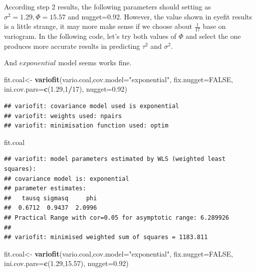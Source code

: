\documentclass[]{article}
\newenvironment{Shaded}{\begin{snugshade}}{\end{snugshade}}
\newcommand{\KeywordTok}[1]{\textcolor[rgb]{0.13,0.29,0.53}{\textbf{#1}}}
\newcommand{\DataTypeTok}[1]{\textcolor[rgb]{0.13,0.29,0.53}{#1}}
\newcommand{\DecValTok}[1]{\textcolor[rgb]{0.00,0.00,0.81}{#1}}
\newcommand{\FloatTok}[1]{\textcolor[rgb]{0.00,0.00,0.81}{#1}}
\newcommand{\StringTok}[1]{\textcolor[rgb]{0.31,0.60,0.02}{#1}}
\newcommand{\OtherTok}[1]{\textcolor[rgb]{0.56,0.35,0.01}{#1}}
\newcommand{\OperatorTok}[1]{\textcolor[rgb]{0.81,0.36,0.00}{\textbf{#1}}}
\newcommand{\NormalTok}[1]{#1}
\begin{document}
According step 2 results, the following parameters should setting as
\(\sigma^2=1.29,\Phi=15.57\) and nugget=0.92. However, the value shown
in eyefit results is a little strange, it may more make sense if we
choose about \(\frac{1}{17}\) base on variogram. In the following code,
let's try both values of \(\Phi\) and select the one produces more
accurate results in predicting \(\tau^2\) and \(\sigma^2\).

And \(exponential\) model seems works fine.

\begin{Shaded}
\begin{Highlighting}[]
\NormalTok{fit.coal<-}\StringTok{ }\KeywordTok{variofit}\NormalTok{(vario.coal,}\DataTypeTok{cov.model=}\StringTok{"exponential"}\NormalTok{,}
                    \DataTypeTok{fix.nugget=}\OtherTok{FALSE}\NormalTok{,}
                    \DataTypeTok{ini.cov.pars=}\KeywordTok{c}\NormalTok{(}\FloatTok{1.29}\NormalTok{,}\DecValTok{1}\OperatorTok{/}\DecValTok{17}\NormalTok{), }\DataTypeTok{nugget=}\FloatTok{0.92}\NormalTok{)}
\end{Highlighting}
\end{Shaded}

\begin{verbatim}
## variofit: covariance model used is exponential 
## variofit: weights used: npairs 
## variofit: minimisation function used: optim
\end{verbatim}

\begin{Shaded}
\begin{Highlighting}[]
\NormalTok{fit.coal}
\end{Highlighting}
\end{Shaded}

\begin{verbatim}
## variofit: model parameters estimated by WLS (weighted least squares):
## covariance model is: exponential
## parameter estimates:
##   tausq sigmasq     phi 
##  0.6712  0.9437  2.0996 
## Practical Range with cor=0.05 for asymptotic range: 6.289926
## 
## variofit: minimised weighted sum of squares = 1183.811
\end{verbatim}

\begin{Shaded}
\begin{Highlighting}[]
\NormalTok{fit.coal<-}\StringTok{ }\KeywordTok{variofit}\NormalTok{(vario.coal,}\DataTypeTok{cov.model=}\StringTok{"exponential"}\NormalTok{,}
                    \DataTypeTok{fix.nugget=}\OtherTok{FALSE}\NormalTok{,}
                    \DataTypeTok{ini.cov.pars=}\KeywordTok{c}\NormalTok{(}\FloatTok{1.29}\NormalTok{,}\FloatTok{15.57}\NormalTok{), }\DataTypeTok{nugget=}\FloatTok{0.92}\NormalTok{)}
\end{Highlighting}
\end{Shaded}
\end{document}
